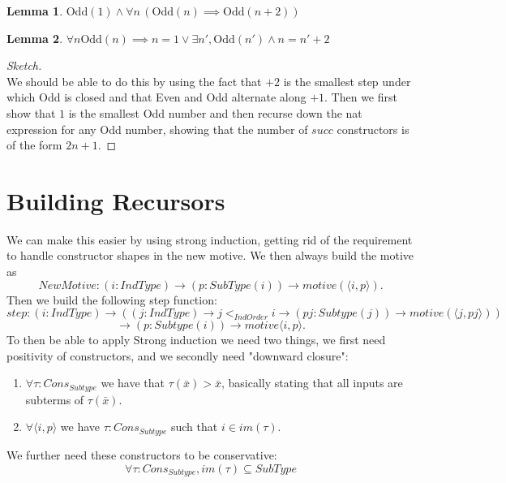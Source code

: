 \documentclass{article}
\newtheorem{lemma}{Lemma}
\begin{document}
\begin{lemma}
    $\text{Odd}(1) \land \forall n \, (\text{Odd}(n) \implies \text{Odd}(n + 2))$
\end{lemma}

\begin{lemma}
    $\forall n \text{Odd}(n) \implies n = 1 \lor \exists n', \text{Odd}(n') \land n = n' + 2$
\end{lemma}

\begin{proof}[Sketch]\mbox{}\\
    We should be able to do this by using the fact that $+2$ is the smallest step under which Odd is closed and that Even and Odd alternate along $+1$. Then we first show that $1$ is the smallest Odd number and then recurse down the nat expression for any Odd number, showing that the number of $succ$ constructors is of the form $2n + 1$.
\end{proof}

\newpage

\section{Building Recursors}

We can make this easier by using strong induction, getting rid of the requirement to handle constructor shapes in the new motive. We then always build the motive as 
    \[NewMotive : (i : IndType) \rightarrow (p : SubType(i)) \rightarrow motive (\langle i, p \rangle).\]
Then we build the following step function:
\[ step: (i : IndType) \rightarrow ((j : IndType) \rightarrow j <_{IndOrder} i \rightarrow (pj : Subtype(j)) \rightarrow motive(\langle j, pj \rangle)) \]
\[ \rightarrow (p : Subtype(i)) \rightarrow motive \langle i , p \rangle. \]
To then be able to apply Strong induction we need two things, we first need positivity of constructors, and we secondly need "downward closure":
\begin{enumerate}
    \item $\forall \tau : Cons_{Subtype}$ we have that $\tau(\bar{x}) > \bar{x}$, basically stating that all inputs are subterms of $\tau(\bar{x})$.
    \item $\forall \langle i, p \rangle$ we have $\tau : Cons_{Subtype}$ such that $i \in im(\tau)$.
\end{enumerate}

We further need these constructors to be conservative: 
\[\forall \tau : Cons_{Subtype}, im(\tau) \subseteq SubType\]
\end{document}
